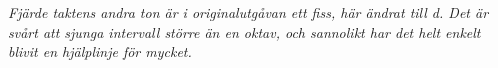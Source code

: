 \vspace{5mm}
\textit{
Fjärde taktens andra ton är i originalutgåvan ett fiss, här ändrat till d.
Det är svårt att sjunga intervall större än en oktav, och sannolikt har
det helt enkelt blivit en hjälplinje för mycket.
}
